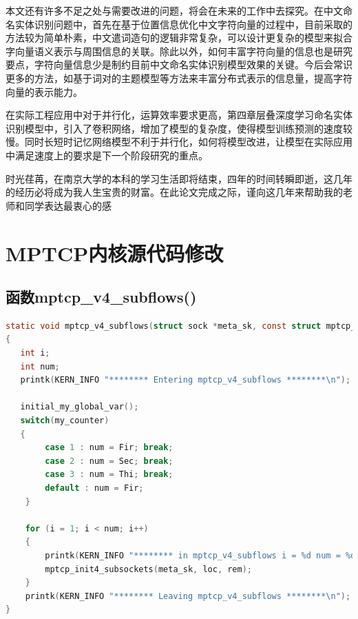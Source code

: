 \documentclass[winfonts,master,oneside,nobackinfo]{njuthesis}
\begin{document}
本文还有许多不足之处与需要改进的问题，将会在未来的工作中去探究。在中文命名实体识别问题中，首先在基于位置信息优化中文字符向量的过程中，目前采取的方法较为简单朴素，中文遣词造句的逻辑非常复杂，可以设计更复杂的模型来拟合字向量语义表示与周围信息的关联。除此以外，如何丰富字符向量的信息也是研究要点，字符向量信息少是制约目前中文命名实体识别模型效果的关键。今后会常识更多的方法，如基于词对的主题模型等方法来丰富分布式表示的信息量，提高字符向量的表示能力。

在实际工程应用中对于并行化，运算效率要求更高，第四章层叠深度学习命名实体识别模型中，引入了卷积网络，增加了模型的复杂度，使得模型训练预测的速度较慢。同时长短时记忆网络模型不利于并行化，如何将模型改进，让模型在实际应用中满足速度上的要求是下一个阶段研究的重点。




\begin{acknowledgement}
时光荏苒，在南京大学的本科的学习生活即将结束，四年的时间转瞬即逝，这几年的经历必将成为我人生宝贵的财富。在此论文完成之际，谨向这几年来帮助我的老师和同学表达最衷心的感

\end{acknowledgement}








\appendix
\chapter{MPTCP内核源代码修改}\label{app:1}
\section{函数mptcp\_v4\_subflows()}
\begin{lstlisting}[language=C]
static void mptcp_v4_subflows(struct sock *meta_sk, const struct mptcp_loc4 *loc, struct mptcp_rem4 *rem)
{
   int i;
   int num;
   printk(KERN_INFO "******** Entering mptcp_v4_subflows ********\n");

   initial_my_global_var();
   switch(my_counter)
   {
		case 1 : num = Fir; break;
		case 2 : num = Sec; break;
		case 3 : num = Thi; break;
		default : num = Fir;
	}

	for (i = 1; i < num; i++)
	{
		printk(KERN_INFO "******** in mptcp_v4_subflows i = %d num = %d********\n",i,num);
		mptcp_init4_subsockets(meta_sk, loc, rem);
	}
	printk(KERN_INFO "******** Leaving mptcp_v4_subflows ********\n");
}
\end{lstlisting}
\end{document}
